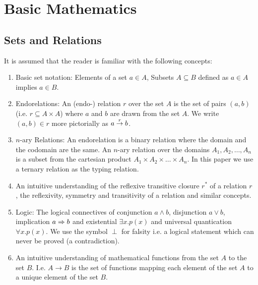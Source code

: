\section{Basic Mathematics}
\label{sec:BasicMathematics}

\begin{comment}
    - Logic:
        - Rule notation
        - Universal quantification

    - Inductive Sets
\end{comment}



\subsection{Sets and Relations}

It is assumed that the reader is familiar with the following concepts:

\begin{enumerate}

\item Basic set notation: Elements of a set $a \in A$, Subsets $A \subseteq B$
defined as $a \in A$ implies $a \in B$.

\item Endorelations: An (endo-) relation $r$ over the set $A$ is the set of pairs
    $(a,b)$ (i.e. $r \subseteq A \times A$) where $a$ and $b$ are drawn from the
    set $A$. We write $(a,b) \in r$ more pictorially as $a \stackrel{r}{\to} b$.

\item $n$-ary Relations: An endorelation is a binary relation where the domain
    and the codomain are the same. An $n$-ary relation over the domains $A_1,
        A_2, \ldots, A_n$ is a subset from the cartesian product $A_1 \times A_2
        \times \ldots \times A_n$. In this paper we use a ternary relation as
        the typing relation.

\item An intuitive understanding of the reflexive transitive closure $r^*$ of a
relation $r$, the reflexivity, symmetry and transitivity of a relation and
similar concepts.

\item Logic: The logical connectives of conjunction $a \land b$, disjunction $a
\lor b$, implication $a \Rightarrow b$ and existential $\exists x. p(x)$ and universal
quantication $\forall x.p(x)$. We use the symbol $\perp$ for falsity i.e. a
logical statement which can never be proved (a contradiction).

\item An intuitive understanding of mathematical functions from the set $A$ to
the set $B$. I.e. $A \to B$ is the set of functions mapping each element of the
set $A$ to a unique element of the set $B$.
\end{enumerate}





